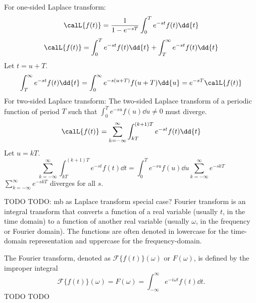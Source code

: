 \documentclass[a4paper,12pt]{article}
\begin{document}
For one-sided Laplace transform:
\[\calL\{f(t)\}=\frac{1}{1-e^{-sT}}\int_0^Te^{-st}f(t)\dd{t}\]
\bpr
\[\calL\{f(t)\}=\int_0^Te^{-st}f(t)\dd{t}+\int_T^{\infty}e^{-st}f(t)\dd{t}\]
Let $t=u+T$.
\[\int_T^{\infty}e^{-st}f(t)\dd{t}=\int_0^{\infty}e^{-s(u+T)}f(u+T)\dd{u}=e^{-sT}\calL\{f(t)\}\]
\epr
For two-sided Laplace transform: The two-sided Laplace transform of a periodic function of period $T$ such that $\int_0^Te^{-su}f(u)\dd{u}\ne 0$ must diverge.
\bpr
\[\calL\{f(t)\}=\sum_{k=-\infty}^{\infty}\int_{kT}^{(k+1)T}e^{-st}f(t)\dd{t}\]
Let $u=kT$.
\[\sum_{k=-\infty}^{\infty}\int_{kT}^{(k+1)T}e^{-st}f(t)\dd{t}=\int_0^Te^{-su}f(u)\dd{u}\sum_{k=-\infty}^{\infty}e^{-skT}\]
$\sum_{k=-\infty}^{\infty}e^{-skT}$ diverges for all $s$.
\epr














TODO
TODO: mb as Laplace transform special case?
Fourier transform is an integral transform that converts a function of a real variable (usually $t$, in the time domain) to a function of another real variable (usually $\omega$, in the frequency or Fourier domain). The functions are often denoted in lowercase for the time-domain representation and uppercase for the frequency-domain.

The Fourier transform, denoted as $\mathcal{F}\{f(t)\}(\omega)$ or $F(\omega)$, is defined by the improper integral
\[\mathcal{F}\{f(t)\}(\omega) = F(\omega) = \int_{-\infty}^{\infty}e^{-i\omega t}f(t)\dd{t}.\]
TODO
TODO
\end{document}

